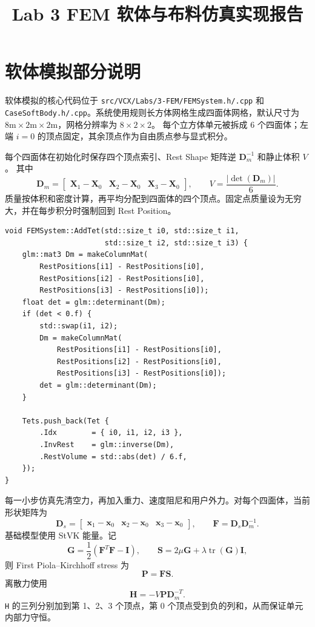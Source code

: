 \documentclass[UTF8,a4paper,11pt,fontset=fandol]{ctexart}
\title{Lab 3 FEM 软体与布料仿真实现报告}
\author{}
\date{}
\begin{document}
\maketitle

\section{软体模拟部分说明}

软体模拟的核心代码位于 \texttt{src/VCX/Labs/3-FEM/FEMSystem.h/.cpp} 和
\texttt{CaseSoftBody.h/.cpp}。系统使用规则长方体网格生成四面体网格，默认尺寸为
$8\mathrm{m}\times 2\mathrm{m}\times 2\mathrm{m}$，网格分辨率为 $8\times2\times2$。
每个立方体单元被拆成 6 个四面体；左端 $i=0$ 的顶点固定，其余顶点作为自由质点参与显式积分。

每个四面体在初始化时保存四个顶点索引、Rest Shape 矩阵逆 $\mathbf{D}_m^{-1}$ 和静止体积 $V$。
其中
\[
\mathbf{D}_m =
\begin{bmatrix}
\mathbf{X}_1-\mathbf{X}_0 &
\mathbf{X}_2-\mathbf{X}_0 &
\mathbf{X}_3-\mathbf{X}_0
\end{bmatrix},
\qquad
V=\frac{|\det(\mathbf{D}_m)|}{6}.
\]
质量按体积和密度计算，再平均分配到四面体的四个顶点。固定点质量设为无穷大，并在每步积分时强制回到 Rest Position。

\begin{lstlisting}[style=cppstyle,caption={四面体初始化时记录 Rest Shape 信息}]
void FEMSystem::AddTet(std::size_t i0, std::size_t i1,
                       std::size_t i2, std::size_t i3) {
    glm::mat3 Dm = makeColumnMat(
        RestPositions[i1] - RestPositions[i0],
        RestPositions[i2] - RestPositions[i0],
        RestPositions[i3] - RestPositions[i0]);
    float det = glm::determinant(Dm);
    if (det < 0.f) {
        std::swap(i1, i2);
        Dm = makeColumnMat(
            RestPositions[i1] - RestPositions[i0],
            RestPositions[i2] - RestPositions[i0],
            RestPositions[i3] - RestPositions[i0]);
        det = glm::determinant(Dm);
    }

    Tets.push_back(Tet {
        .Idx        = { i0, i1, i2, i3 },
        .InvRest    = glm::inverse(Dm),
        .RestVolume = std::abs(det) / 6.f,
    });
}
\end{lstlisting}

每一小步仿真先清空力，再加入重力、速度阻尼和用户外力。对每个四面体，当前形状矩阵为
\[
\mathbf{D}_s =
\begin{bmatrix}
\mathbf{x}_1-\mathbf{x}_0 &
\mathbf{x}_2-\mathbf{x}_0 &
\mathbf{x}_3-\mathbf{x}_0
\end{bmatrix},
\qquad
\mathbf{F}=\mathbf{D}_s\mathbf{D}_m^{-1}.
\]
基础模型使用 StVK 能量。记
\[
\mathbf{G}=\frac{1}{2}(\mathbf{F}^{T}\mathbf{F}-\mathbf{I}),\qquad
\mathbf{S}=2\mu \mathbf{G}+\lambda \operatorname{tr}(\mathbf{G})\mathbf{I},
\]
则 First Piola--Kirchhoff stress 为
\[
\mathbf{P}=\mathbf{F}\mathbf{S}.
\]
离散力使用
\[
\mathbf{H}=-V\mathbf{P}\mathbf{D}_m^{-T}.
\]
\texttt{H} 的三列分别加到第 1、2、3 个顶点，第 0 个顶点受到负的列和，从而保证单元内部力守恒。
\end{document}
